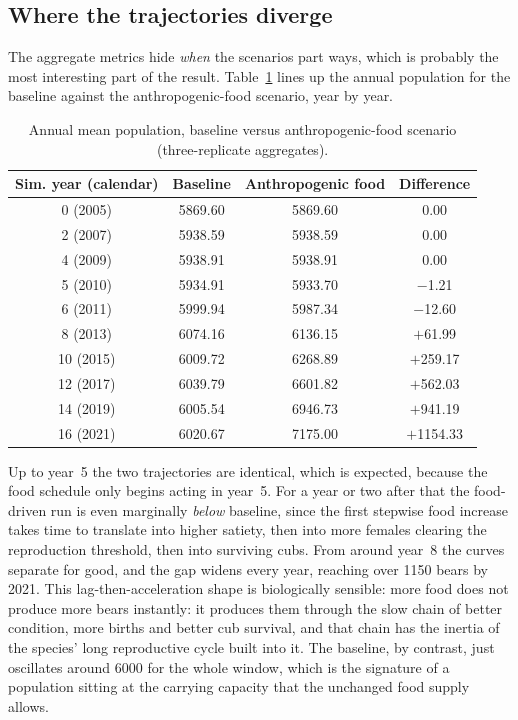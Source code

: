 \subsection{Where the trajectories diverge}

The aggregate metrics hide \emph{when} the scenarios part ways, which is probably the most interesting part of the result. Table~\ref{tab:ch4_yearly} lines up the annual population for the baseline against the anthropogenic-food scenario, year by year.

\begin{table}[htbp]
\centering
\caption{Annual mean population, baseline versus anthropogenic-food scenario (three-replicate aggregates).}
\label{tab:ch4_yearly}
\begin{tabular}{|c|c|c|c|}
\hline
Sim. year (calendar) & Baseline & Anthropogenic food & Difference \\
\hline
0 (2005) & 5869.60 & 5869.60 & 0.00 \\
2 (2007) & 5938.59 & 5938.59 & 0.00 \\
4 (2009) & 5938.91 & 5938.91 & 0.00 \\
5 (2010) & 5934.91 & 5933.70 & $-$1.21 \\
6 (2011) & 5999.94 & 5987.34 & $-$12.60 \\
8 (2013) & 6074.16 & 6136.15 & $+$61.99 \\
10 (2015) & 6009.72 & 6268.89 & $+$259.17 \\
12 (2017) & 6039.79 & 6601.82 & $+$562.03 \\
14 (2019) & 6005.54 & 6946.73 & $+$941.19 \\
16 (2021) & 6020.67 & 7175.00 & $+$1154.33 \\
\hline
\end{tabular}
\end{table}

Up to year~5 the two trajectories are identical, which is expected, because the food schedule only begins acting in year~5. For a year or two after that the food-driven run is even marginally \emph{below} baseline, since the first stepwise food increase takes time to translate into higher satiety, then into more females clearing the reproduction threshold, then into surviving cubs. From around year~8 the curves separate for good, and the gap widens every year, reaching over 1150 bears by 2021. This lag-then-acceleration shape is biologically sensible: more food does not produce more bears instantly: it produces them through the slow chain of better condition, more births and better cub survival, and that chain has the inertia of the species' long reproductive cycle built into it. The baseline, by contrast, just oscillates around 6000 for the whole window, which is the signature of a population sitting at the carrying capacity that the unchanged food supply allows.

